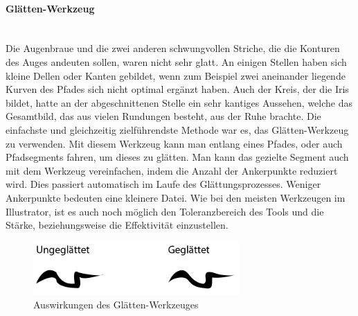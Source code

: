 \paragraph{Glätten-Werkzeug}
\leavevmode \\
Die Augenbraue und die zwei anderen schwungvollen Striche, die die Konturen des Auges andeuten sollen, waren nicht sehr glatt. An einigen Stellen haben sich kleine Dellen oder Kanten gebildet, wenn zum Beispiel zwei aneinander liegende Kurven des Pfades sich nicht optimal ergänzt haben. Auch der Kreis, der die Iris bildet, hatte an der abgeschnittenen Stelle ein sehr kantiges Aussehen, welche das Gesamtbild, das aus vielen Rundungen besteht, aus der Ruhe brachte. Die einfachste und gleichzeitig zielführendste Methode war es, das Glätten-Werkzeug zu verwenden. Mit diesem Werkzeug kann man entlang eines Pfades, oder auch Pfadsegments fahren, um dieses zu glätten. Man kann das gezielte Segment auch mit dem Werkzeug vereinfachen, indem die Anzahl der Ankerpunkte reduziert wird. Dies passiert automatisch im Laufe des Glättungsprozesses. Weniger Ankerpunkte bedeuten eine kleinere Datei. Wie bei den meisten Werkzeugen im Illustrator, ist es auch noch möglich den Toleranzbereich des Tools und die Stärke, beziehungsweise die Effektivität einzustellen.\cite{glatt}

\begin{figure}[H] 
  \centering
     \includegraphics[width=0.7\textwidth]{design_abb3.png}
  \caption{Auswirkungen des Glätten-Werkzeuges}
\end{figure}

